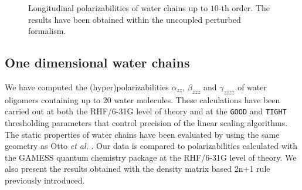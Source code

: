 \documentclass[prl,aps,twocolumn,showpacs,twocolumngrid,superbib]{revtex4}
\begin{document}
\begin{figure}[t]
  \caption{\protect
    Longitudinal polarizabilities of water chains up to $10$-th order.
    The results have been obtained within the uncoupled perturbed formalism.
  }\label{fig:10th order h2o}
\end{figure}


\subsection{One dimensional water chains}
We have computed the (hyper)polarizabilities $\alpha_{zz}$, 
$\beta_{zzz}$ and $\gamma_{zzzz}$ of water oligomers containing
up to 20 water molecules. These calculations have been carried out at
both the RHF/6-31G level of
theory and at the {\tt GOOD} and {\tt TIGHT} thresholding parameters 
that control precision of the linear scaling algorithms.
The static properties of water chains have been evaluated
by using the same geometry as Otto {\em et al.} \cite{POtto99}. 
Our data is compared to polarizabilities
calculated with the GAMESS quantum chemistry package \cite{gamess} 
at the RHF/6-31G level of theory.  We also
present the results obtained with the density matrix 
based 2n+1 rule previously introduced.
\end{document}
